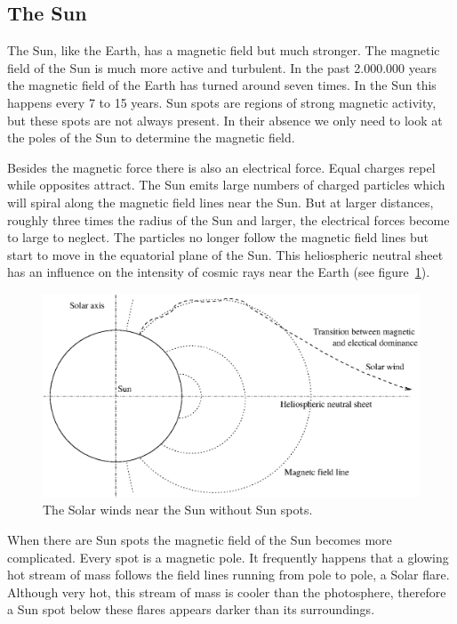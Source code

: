 \documentclass[12pt,a4paper]{article}
\numberwithin{equation}{section}
\numberwithin{figure}{section}
\numberwithin{table}{section}
\begin{document}
\subsection{The Sun}
The Sun, like the Earth, has a magnetic field but much stronger. The magnetic field of the Sun is much more active and turbulent. In the past 2.000.000 years the magnetic field of the Earth has turned around seven times. In the Sun this happens every 7 to 15 years. Sun spots are regions of strong magnetic activity, but these spots are not always present. In their absence we only need to look at the poles of the Sun to determine the magnetic field.

Besides the magnetic force there is also an electrical force. Equal charges repel while opposites attract. The Sun emits large numbers of charged particles which will spiral along the magnetic field lines near the Sun. But at larger distances, roughly three times the radius of the Sun and larger, the electrical forces become to large to neglect. The particles no longer follow the magnetic field lines but start to move in the equatorial plane of the Sun. This heliospheric neutral sheet has an influence on the intensity of cosmic rays near the Earth (see figure~\ref{fig:sun_field}).  

\begin{figure}\begin{center}
\includegraphics[scale=0.88]{orbit.eps}
\caption{The Solar winds near the Sun without Sun spots.} \label{fig:sun_field}
\end{center}\end{figure}

When there are Sun spots the magnetic field of the Sun becomes more complicated. Every spot is a magnetic pole. It frequently happens that a glowing hot stream of mass follows the field lines running from pole to pole, a Solar flare. Although very hot, this stream of mass is cooler than the photosphere, therefore a Sun spot below these flares appears darker than its surroundings.
\end{document}
